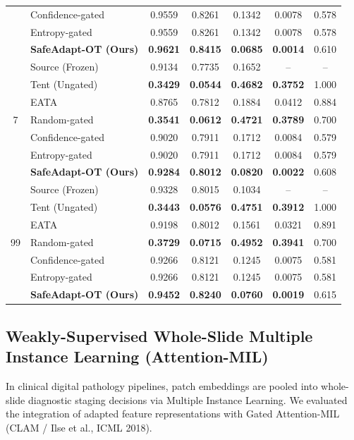 \documentclass[journal]{IEEEtran}
\begin{document}
\begin{table}[t]
{\begin{tabular}{@{}clccccc@{}}
& Confidence-gated & 0.9559 & 0.8261 & 0.1342 & 0.0078 & 0.578 \\
& Entropy-gated & 0.9559 & 0.8261 & 0.1342 & 0.0078 & 0.578 \\
& \textbf{SafeAdapt-OT (Ours)} & \textbf{0.9621} & \textbf{0.8415} & \textbf{0.0685} & \textbf{0.0014} & 0.610 \\
\midrule
\multirow{7}{*}{7} 
& Source (Frozen) & 0.9134 & 0.7735 & 0.1652 & -- & -- \\
& Tent (Ungated) & \textbf{0.3429} & \textbf{0.0544} & \textbf{0.4682} & \textbf{0.3752} & 1.000 \\
& EATA & 0.8765 & 0.7812 & 0.1884 & 0.0412 & 0.884 \\
& Random-gated & \textbf{0.3541} & \textbf{0.0612} & \textbf{0.4721} & \textbf{0.3789} & 0.700 \\
& Confidence-gated & 0.9020 & 0.7911 & 0.1712 & 0.0084 & 0.579 \\
& Entropy-gated & 0.9020 & 0.7911 & 0.1712 & 0.0084 & 0.579 \\
& \textbf{SafeAdapt-OT (Ours)} & \textbf{0.9284} & \textbf{0.8012} & \textbf{0.0820} & \textbf{0.0022} & 0.608 \\
\midrule
\multirow{7}{*}{99} 
& Source (Frozen) & 0.9328 & 0.8015 & 0.1034 & -- & -- \\
& Tent (Ungated) & \textbf{0.3443} & \textbf{0.0576} & \textbf{0.4751} & \textbf{0.3912} & 1.000 \\
& EATA & 0.9198 & 0.8012 & 0.1561 & 0.0321 & 0.891 \\
& Random-gated & \textbf{0.3729} & \textbf{0.0715} & \textbf{0.4952} & \textbf{0.3941} & 0.700 \\
& Confidence-gated & 0.9266 & 0.8121 & 0.1245 & 0.0075 & 0.581 \\
& Entropy-gated & 0.9266 & 0.8121 & 0.1245 & 0.0075 & 0.581 \\
& \textbf{SafeAdapt-OT (Ours)} & \textbf{0.9452} & \textbf{0.8240} & \textbf{0.0760} & \textbf{0.0019} & 0.615 \\
\bottomrule
\end{tabular}%
}
\end{table}

\subsection{Weakly-Supervised Whole-Slide Multiple Instance Learning (Attention-MIL)}
In clinical digital pathology pipelines, patch embeddings are pooled into whole-slide diagnostic staging decisions via Multiple Instance Learning. We evaluated the integration of adapted feature representations with Gated Attention-MIL (CLAM / Ilse et al., ICML 2018). 
\end{document}
